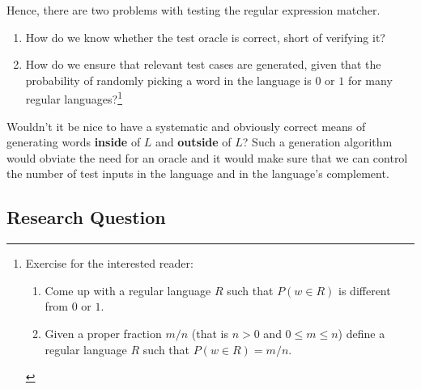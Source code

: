Hence, there are two problems with testing the regular expression
matcher.
\begin{enumerate}
\item How do we know whether the test oracle is correct, short of
  verifying it?
\item How do we ensure that relevant test cases are generated, given
  that the probability of randomly picking a word in the language is
  $0$ or $1$ for many regular languages?\footnote{Exercise for the
    interested reader:
    \begin{enumerate}
    \item Come up with a regular language $R$ such that $P(w\in R)$ is
      different from $0$ or $1$.
    \item Given a proper fraction $m/n$ (that is $n>0$ and $0\le m\le
      n$) define a regular language $R$ such that $P (w\in R) = m/n$.
    \end{enumerate}
  }
\end{enumerate}


Wouldn't it be nice to have a systematic and obviously correct means
of generating words \textbf{inside} of $L$ and \textbf{outside} of
$L$? Such a generation algorithm would obviate the need for an oracle
and it would make sure that we can control the number of test inputs
in the language and in the language's complement.

\subsection{Research Question}
\label{sec:research-question}

